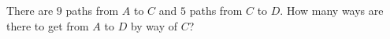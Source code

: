 There are $9$ paths from $A$ to $C$ and $5$ paths from $C$ to $D$. How many ways are there to get from $A$ to $D$ by way of $C$?

